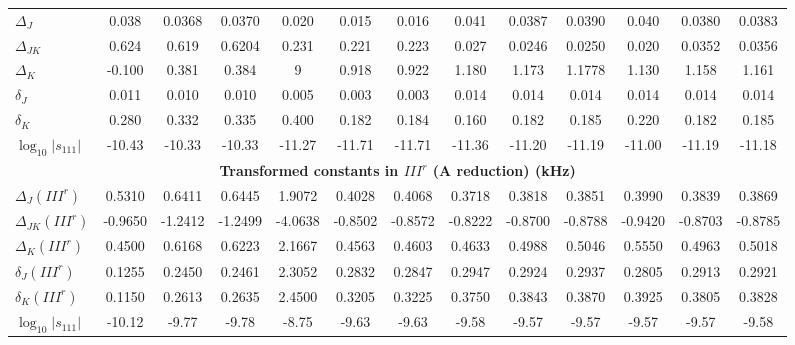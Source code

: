 \begin{table}[ht]
\begin{tabular}{lcccccccccccc}
  $\Delta_J$ &
  0.038 & 0.0368 & 0.0370 &
  0.020 & 0.015 & 0.016 &
  0.041 & 0.0387 & 0.0390 &
  0.040 & 0.0380 & 0.0383 \\

  $\Delta_{JK}$ &
  0.624 & 0.619 & 0.6204 &
  0.231 & 0.221 & 0.223 &
  0.027 & 0.0246 & 0.0250 &
  0.020 & 0.0352 & 0.0356 \\

  $\Delta_K$ &
  -0.100 & 0.381 & 0.384 &
  9 & 0.918 & 0.922 &
  1.180 & 1.173 & 1.1778 &
  1.130 & 1.158 & 1.161 \\

  $\delta_J$ &
  0.011 & 0.010 & 0.010 &
  0.005 & 0.003 & 0.003 &
  0.014 & 0.014 & 0.014 &
  0.014 & 0.014 & 0.014 \\

  $\delta_K$ &
  0.280 & 0.332 & 0.335 &
  0.400 & 0.182 & 0.184 &
  0.160 & 0.182 & 0.185 &
  0.220 & 0.182 & 0.185 \\

  $\log_{10}|s_{111}|$ &
  -10.43 & -10.33 & -10.33 &
  -11.27 & -11.71 & -11.71 &
  -11.36 & -11.20 & -11.19 &
  -11.00 & -11.19 & -11.18 \\

  \midrule
  \multicolumn{13}{c}{\textbf{Transformed constants in $III^r$ (A reduction) (kHz)}} \\

  $\Delta_J(III^r)$ &
  0.5310 & 0.6411 & 0.6445 &
  1.9072 & 0.4028 & 0.4068 &
  0.3718 & 0.3818 & 0.3851 &
  0.3990 & 0.3839 & 0.3869 \\

  $\Delta_{JK}(III^r)$ &
  -0.9650 & -1.2412 & -1.2499 &
  -4.0638 & -0.8502 & -0.8572 &
  -0.8222 & -0.8700 & -0.8788 &
  -0.9420 & -0.8703 & -0.8785 \\

  $\Delta_K(III^r)$ &
  0.4500 & 0.6168 & 0.6223 &
  2.1667 & 0.4563 & 0.4603 &
  0.4633 & 0.4988 & 0.5046 &
  0.5550 & 0.4963 & 0.5018 \\

  $\delta_J(III^r)$ &
  0.1255 & 0.2450 & 0.2461 &
  2.3052 & 0.2832 & 0.2847 &
  0.2947 & 0.2924 & 0.2937 &
  0.2805 & 0.2913 & 0.2921 \\

  $\delta_K(III^r)$ &
  0.1150 & 0.2613 & 0.2635 &
  2.4500 & 0.3205 & 0.3225 &
  0.3750 & 0.3843 & 0.3870 &
  0.3925 & 0.3805 & 0.3828 \\

  $\log_{10}|s_{111}|$ &
  -10.12 & -9.77 & -9.78 &
  -8.75 & -9.63 & -9.63 &
  -9.58 & -9.57 & -9.57 &
  -9.57 & -9.57 & -9.58 \\


\end{tabular}
\end{table}
